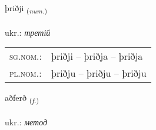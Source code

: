 \documentclass[frontgrid, backgrid]{flacards}\usepackage[]{graphicx}\usepackage[]{xcolor}
\begin{document}
\renewcommand{\blhead}{\vskip5pt {\small\bfseries\footnotesize Töluorð | чисельник }}
\renewcommand{\bcfoot}{\vskip5pt \hspace{2pt}{\small\bfseries\footnotesize 1K}}


{þriðji \small{\textsubscript{(\textit{num.})}} \\[1ex] %
\textphonetic{[θrɪðjɪ]} \\
ukr.: \emph{третій} \\  [2ex]
\renewcommand*{\arraystretch}{0.8}
\begin{tabular}{ll}
\textsc{sg.nom.}: & þriðji  --  þriðja -- þriðja \\ 
\textsc{pl.nom.}: & þriðju -- þriðju -- þriðju
\end{tabular}
}

\renewcommand{\flhead}{\vskip5pt \fboxsep=0pt {\small\bfseries\footnotesize Nafnorð | іменник}}
\renewcommand{\fcfoot}{\vskip5pt \fboxsep=0pt \hspace{2pt}{\small\bfseries\footnotesize 1K}}

\renewcommand{\blhead}{\vskip5pt {\small\bfseries\footnotesize Nafnorð | іменник }}
\renewcommand{\bcfoot}{\vskip5pt \hspace{2pt}{\small\bfseries\footnotesize 1K}}


{aðferð \small{\textsubscript{(\textit{f.})}} \\[1ex] %
\textphonetic{[aðfɛrð]} \\
ukr.: \emph{метод} \\  [2ex]
\renewcommand*{\arraystretch}{0.8}
}

\renewcommand{\flhead}{\vskip5pt \fboxsep=0pt {\small\bfseries\footnotesize Fornafn | займенник}}
\renewcommand{\fcfoot}{\vskip5pt \fboxsep=0pt \hspace{2pt}{\small\bfseries\footnotesize 1K}}
\end{document}
